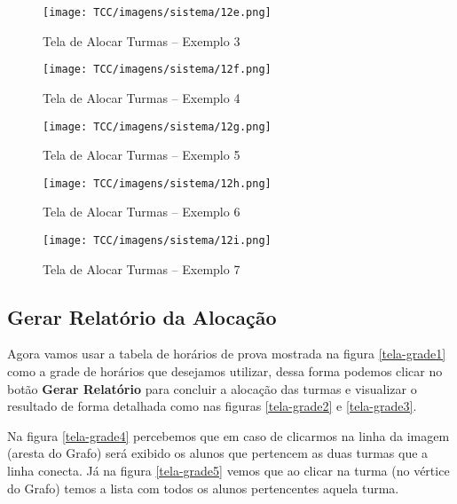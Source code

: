\begin{anexosenv}
\begin{figure}[H]
     \centering
     \texttt{[image: TCC/imagens/sistema/12e.png]}
     \caption{Tela de Alocar Turmas -- Exemplo 3}
     \label{tela-aloc-ex3}
\end{figure}

\begin{figure}[H]
     \centering
     \texttt{[image: TCC/imagens/sistema/12f.png]}
     \caption{Tela de Alocar Turmas -- Exemplo 4}
     \label{tela-aloc-ex4}
\end{figure}

\begin{figure}[H]
     \centering
     \texttt{[image: TCC/imagens/sistema/12g.png]}
     \caption{Tela de Alocar Turmas -- Exemplo 5}
     \label{tela-aloc-ex5}
\end{figure}



\begin{figure}[H]
     \centering
     \texttt{[image: TCC/imagens/sistema/12h.png]}
     \caption{Tela de Alocar Turmas -- Exemplo 6}
     \label{tela-aloc-ex6}
\end{figure}

\begin{figure}[H]
     \centering
     \texttt{[image: TCC/imagens/sistema/12i.png]}
     \caption{Tela de Alocar Turmas -- Exemplo 7}
     \label{tela-aloc-ex7}
\end{figure}



 





\subsection{Gerar Relatório da Alocação}


Agora vamos usar a tabela de horários de prova mostrada na figura \ref{tela-grade1} como a grade de horários que desejamos utilizar, dessa forma podemos clicar no botão \textbf{Gerar Relatório} para concluir a alocação das turmas e visualizar o resultado de forma detalhada como nas figuras \ref{tela-grade2} e \ref{tela-grade3}.

Na figura \ref{tela-grade4} percebemos que em caso de clicarmos na linha da imagem (aresta do Grafo) será exibido os alunos que pertencem as duas turmas que a linha conecta. Já na figura \ref{tela-grade5} vemos que ao clicar na turma (no vértice do Grafo) temos a lista com todos os alunos pertencentes aquela turma.


\end{anexosenv}
